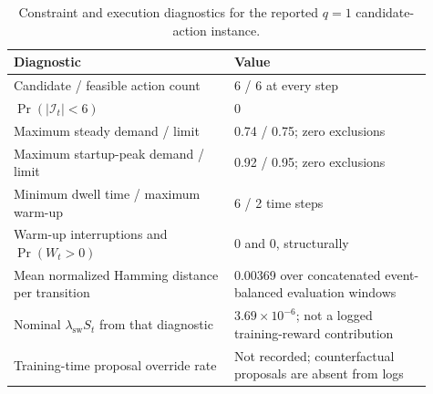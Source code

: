 \documentclass[preprint,12pt]{elsarticle}
\begin{document}
\begin{table}[H]
  \centering
  \caption{Constraint and execution diagnostics for the reported $q=1$
  candidate-action instance.}
  \label{tab:constraint_activation_diagnostics}
  \scriptsize
  \setlength{\tabcolsep}{3.0pt}
  \begin{tabular}{@{}p{0.48\linewidth}p{0.43\linewidth}@{}}
    \toprule
    Diagnostic & Value \\
    \midrule
    Candidate / feasible action count & 6 / 6 at every step \\
    $\Pr(|\mathcal{I}_t|<6)$ & 0 \\
    Maximum steady demand / limit & 0.74 / 0.75; zero exclusions \\
    Maximum startup-peak demand / limit & 0.92 / 0.95; zero exclusions \\
    Minimum dwell time / maximum warm-up & 6 / 2 time steps \\
    Warm-up interruptions and $\Pr(W_t>0)$ & 0 and 0, structurally \\
    Mean normalized Hamming distance per transition & 0.00369 over concatenated event-balanced evaluation windows \\
    Nominal $\lambda_{\mathrm{sw}}S_t$ from that diagnostic & $3.69\times10^{-6}$; not a logged training-reward contribution \\
    Training-time proposal override rate & Not recorded; counterfactual proposals are absent from logs \\
    \bottomrule
  \end{tabular}
\end{table}

\FloatBarrier
\end{document}
